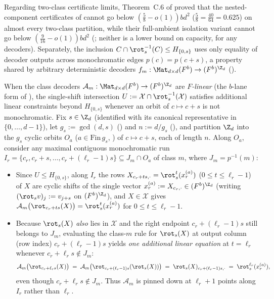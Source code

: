 Regarding two-class certificate limits, Theorem~C.6 of \cite{SharedDecoders2026} proved that the
nested-component certificates of \cite{SharedDecoders2026} cannot go below
$(\frac{5}{8} - o(1)) b d^2$ ($\frac{5}{8} = \frac{40}{64} = 0.625$) on almost every two-class
partition, while their full-ambient isolation variant cannot go below $(\frac{9}{16} - o(1)) b d^2$
(\cite[Theorem~C.7]{SharedDecoders2026}; neither is a lower bound on capacity, for any decoders).
Separately, the inclusion $C \cap \rot_s^{-1}(C) \le H_{\{0, s\}}$ uses only equality of decoder
outputs across monochromatic edges $p(c) = p(c + s)$, a property shared by arbitrary deterministic
decoders $f_m : \Mat_{d\times d}(F^b) \to (F^b)^{\Z_d}$ ().

When the class decoders $\mathcal{A}_m : \Mat_{d\times d}(F^b) \to (F^b)^{\Z_d}$ are \emph{$F$-linear}
(the $b$-lane form of \cite[Definition~6.3]{SeventeenthPaper2026}), the single-shift intersection
$U := \mathcal{X} \cap \rot_s^{-1}(\mathcal{X})$ satisfies additional linear constraints beyond
$H_{\{0, s\}}$ whenever an orbit of $c \mapsto c + s$ is not monochromatic. Fix $s \in \Z_d$
(identified with its canonical representative in $\{0,\dots,d-1\}$), let $g_s := \gcd(d, s)$
() and $n := d / g_s$ (), and partition $\Z_d$ into the $g_s$
cyclic orbits $O_a$ ($a \in \mathrm{Fin}\,g_s$, ) of $c \mapsto c + s$, each of
length $n$. Along $O_a$, consider any maximal contiguous monochromatic run
$I_r = \{c_r, c_r + s, \dots, c_r + (\ell_r - 1)s\} \subseteq J_m \cap O_a$ of class $m$, where
$J_m = p^{-1}(m)$:
\begin{itemize}[leftmargin=1.5em]
\item Since $U \le H_{\{0, s\}}$, along $I_r$ the rows $X_{c_r + t s, \cdot} = \rot_s^t(x^{(a)}_r)$
  ($0 \le t \le \ell_r - 1$) of $X$ are cyclic shifts of the single vector
  $x^{(a)}_r := X_{c_r, \cdot} \in (F^b)^{\Z_d}$ (writing $(\rot_s v)_j := v_{j + s}$ on
  $(F^b)^{\Z_d}$), and $X \in \mathcal{X}$ gives
  $\mathcal{A}_m\bigl(\rot_{c_r + t s}(X)\bigr) = \rot_s^t(x^{(a)}_r)$ for $0 \le t \le \ell_r - 1$.
\item Because $\rot_s(X)$ \emph{also} lies in $\mathcal{X}$ and the right endpoint
  $c_r + (\ell_r - 1)s$ still belongs to $J_m$, evaluating the class-$m$ rule for $\rot_s(X)$ at
  output column (row index) $c_r + (\ell_r - 1)s$ yields \emph{one additional linear equation} at
  $t = \ell_r$ whenever $c_r + \ell_r s \notin J_m$:
  \[
    \mathcal{A}_m\bigl(\rot_{c_r + \ell_r s}(X)\bigr)
    \;=\;
    \mathcal{A}_m\bigl(\rot_{c_r + (\ell_r - 1)s}(\rot_s(X))\bigr)
    \;=\;
    \rot_s(X)_{c_r + (\ell_r - 1)s, \cdot}
    \;=\;
    \rot_s^{\ell_r}(x^{(a)}_r),
  \]
  even though $c_r + \ell_r s \notin J_m$. Thus $\mathcal{A}_m$ is pinned down at $\ell_r + 1$ points
  along $I_r$ rather than $\ell_r$.
\end{itemize}


